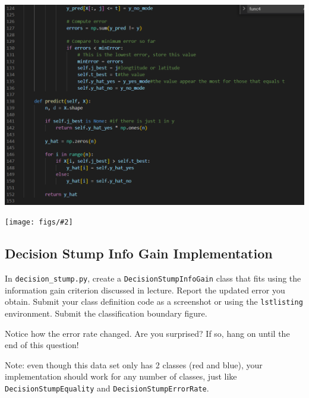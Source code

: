 \documentclass{article}
\def\blu#1{{\color{blu}#1}}
\newcommand{\centerfig}[2]{\begin{center}\texttt{[image: figs/\#2]}\end{center}}
\begin{document}
  \includegraphics{6_2_4}
  \centerfig{.9}{q6_2_decisionBoundary.pdf}
  \clearpage

  \subsection{Decision Stump Info Gain Implementation}

  In \texttt{decision\string_stump.py}, \blu{create a \texttt{DecisionStumpInfoGain} class that
  fits using the information gain criterion discussed in lecture.
  Report the updated error you obtain.
  Submit your class definition code as a screenshot or using the \texttt{lstlisting} environment.
  Submit the classification boundary figure.}

  Notice how the error rate changed. Are you surprised? If so, hang on until the end of this question!

  Note: even though this data set only has 2 classes (red and blue), your implementation should work
  for any number of classes, just like \texttt{DecisionStumpEquality} and \texttt{DecisionStumpErrorRate}.
\end{document}

